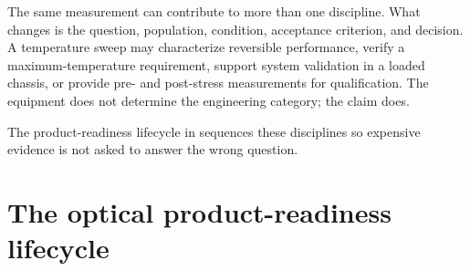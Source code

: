 The same measurement can contribute to more than one discipline. What changes
is the question, population, condition, acceptance criterion, and decision. A
temperature sweep may characterize reversible performance, verify a
maximum-temperature requirement, support system validation in a loaded chassis,
or provide pre- and post-stress measurements for qualification. The equipment
does not determine the engineering category; the claim does.

The product-readiness lifecycle in  sequences these
disciplines so expensive evidence is not asked to answer the wrong question.

\section{The optical product-readiness lifecycle}
\label{sec:product-readiness}
\label{sec:validation-workflow}

